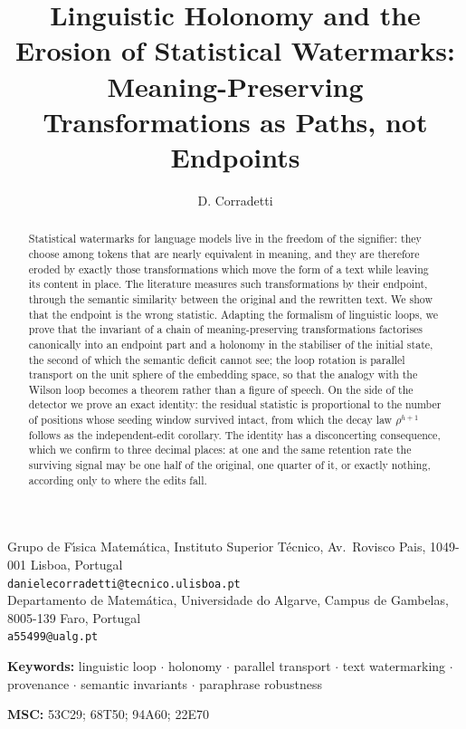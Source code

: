 \documentclass[11pt,a4paper]{article}
\title{Linguistic Holonomy and the Erosion of Statistical Watermarks:\\
Meaning-Preserving Transformations as Paths, not Endpoints}
\author{D. Corradetti}
\date{}
\theoremstyle{plain}
\theoremstyle{definition}
\numberwithin{equation}{section}
\begin{document}
\maketitle

\begin{center}
\small
Grupo de F\'\i sica Matem\'atica, Instituto Superior T\'ecnico,
Av.\ Rovisco Pais, 1049-001 Lisboa, Portugal\\
\texttt{danielecorradetti@tecnico.ulisboa.pt}\\[2pt]
Departamento de Matem\'atica, Universidade do Algarve,
Campus de Gambelas, 8005-139 Faro, Portugal\\
\texttt{a55499@ualg.pt}
\end{center}

\begin{abstract}
Statistical watermarks for language models live in the freedom of the
signifier: they choose among tokens that are nearly equivalent in
meaning, and they are therefore eroded by exactly those transformations
which move the form of a text while leaving its content in place. The
literature measures such transformations by their endpoint, through the
semantic similarity between the original and the rewritten text. We show
that the endpoint is the wrong statistic. Adapting the formalism of
linguistic loops, we prove that the invariant of a chain of
meaning-preserving transformations factorises canonically into an
endpoint part and a holonomy in the stabiliser of the initial state, the
second of which the semantic deficit cannot see; the loop rotation is
parallel transport on the unit sphere of the embedding space, so that
the analogy with the Wilson loop becomes a theorem rather than a figure
of speech. On the side of the detector we prove an exact identity: the
residual statistic is proportional to the number of positions whose
seeding window survived intact, from which the decay law $\rho^{h+1}$
follows as the independent-edit corollary. The identity has a
disconcerting consequence, which we confirm to three decimal places: at
one and the same retention rate the surviving signal may be one half of
the original, one quarter of it, or exactly nothing, according only to
where the edits fall.
\end{abstract}

\noindent\textbf{Keywords:} linguistic loop $\cdot$ holonomy $\cdot$
parallel transport $\cdot$ text watermarking $\cdot$ provenance $\cdot$
semantic invariants $\cdot$ paraphrase robustness

\smallskip
\noindent\textbf{MSC:} 53C29; 68T50; 94A60; 22E70
\end{document}
